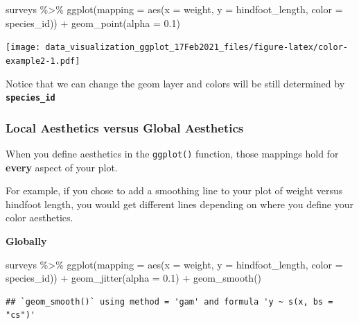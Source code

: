 \documentclass[
]{article}
\newenvironment{Shaded}{\begin{snugshade}}{\end{snugshade}}
\newcommand{\AttributeTok}[1]{\textcolor[rgb]{0.77,0.63,0.00}{#1}}
\newcommand{\FloatTok}[1]{\textcolor[rgb]{0.00,0.00,0.81}{#1}}
\newcommand{\FunctionTok}[1]{\textcolor[rgb]{0.00,0.00,0.00}{#1}}
\newcommand{\NormalTok}[1]{#1}
\newcommand{\SpecialCharTok}[1]{\textcolor[rgb]{0.00,0.00,0.00}{#1}}
\begin{document}
\begin{Shaded}
\begin{Highlighting}[]
\NormalTok{surveys }\SpecialCharTok{\%\textgreater{}\%} 
  \FunctionTok{ggplot}\NormalTok{(}\AttributeTok{mapping =} \FunctionTok{aes}\NormalTok{(}\AttributeTok{x =}\NormalTok{ weight, }\AttributeTok{y =}\NormalTok{ hindfoot\_length, }\AttributeTok{color =}\NormalTok{ species\_id)) }\SpecialCharTok{+}
  \FunctionTok{geom\_point}\NormalTok{(}\AttributeTok{alpha =} \FloatTok{0.1}\NormalTok{)}
\end{Highlighting}
\end{Shaded}

\texttt{[image: data\_visualization\_ggplot\_17Feb2021\_files/figure-latex/color-example2-1.pdf]}

Notice that we can change the geom layer and colors will be still
determined by \textbf{\texttt{species\_id}}

\hypertarget{local-aesthetics-versus-global-aesthetics}{%
\subsubsection{Local Aesthetics versus Global
Aesthetics}\label{local-aesthetics-versus-global-aesthetics}}

When you define aesthetics in the \texttt{ggplot()} function, those
mappings hold for \textbf{every} aspect of your plot.

For example, if you chose to add a smoothing line to your plot of weight
versus hindfoot length, you would get different lines depending on where
you define your color aesthetics.

\textbf{Globally}

\begin{Shaded}
\begin{Highlighting}[]
\NormalTok{surveys }\SpecialCharTok{\%\textgreater{}\%} 
  \FunctionTok{ggplot}\NormalTok{(}\AttributeTok{mapping =} \FunctionTok{aes}\NormalTok{(}\AttributeTok{x =}\NormalTok{ weight, }\AttributeTok{y =}\NormalTok{ hindfoot\_length, }\AttributeTok{color =}\NormalTok{ species\_id)) }\SpecialCharTok{+}
  \FunctionTok{geom\_jitter}\NormalTok{(}\AttributeTok{alpha =} \FloatTok{0.1}\NormalTok{) }\SpecialCharTok{+} 
  \FunctionTok{geom\_smooth}\NormalTok{()}
\end{Highlighting}
\end{Shaded}

\begin{verbatim}
## `geom_smooth()` using method = 'gam' and formula 'y ~ s(x, bs = "cs")'
\end{verbatim}
\end{document}

